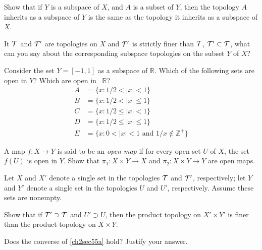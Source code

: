 \begin{exercise}
\item
  Show that if \(Y\) is a subspace of \(X\), and \(A\) is a subset of \(Y\),
  then the topology \(A\) inherits as a subspace of \(Y\) is the same as the
  topology it inherits as a subspace of \(X\).
\item
  It \(\mathcal{T}\) and \(\mathcal{T}'\) are topologies on \(X\) and \(\mathcal{T}'\) is strictly
  finer than \(\mathcal{T}\), \(\mathcal{T}'\subset\mathcal{T}\), what can you say about the
  corresponding subspace topologies on the subset \(Y\) of \(X\)?\
\item
  Consider the set \(Y = [-1,1]\) as a subspace of \(\mathbb{R}\).
  Which of the following sets are open in \(Y\)? Which are open in \
  \(\mathbb{R}\)?
  \begin{align*}
    A & = \{x\colon 1/2 < \lvert x\rvert < 1\}\\
    B & = \{x\colon 1/2 < \lvert x\rvert\leq 1\}\\
    C & = \{x\colon 1/2\leq \lvert x\rvert < 1\}\\
    D & = \{x\colon 1/2\leq \lvert x\rvert\leq 1\}\\
    E & = \{x\colon 0 < \lvert x\rvert < 1\text{ and } 1/x\not\in\mathbb{Z}^+\}
  \end{align*}
\item
  A map \(f\colon X\to Y\) is said to be an \textit{open map} if for every open
  set \(U\) of \(X\), the set \(f(U)\) is open in \(Y\).
  Show that \(\pi_1\colon X\times Y\to X\) and \(\pi_2\colon X\times Y\to Y\)
  are open maps.
\item
  Let \(X\) and \(X'\) denote a single set in the topologies \(\mathcal{T}\) and
  \(\mathcal{T}'\), respectively; let \(Y\) and \(Y'\) denote a single set in the
  topologies \(U\) and \(U'\), respectively.
  Assume these sets are nonempty.
  \begin{exercise}[label = (\alph*), ref = \arabic{exercisei} (\alph*)]
  \item
    \label{ch2sec55a}
    Show that if \(\mathcal{T}'\supset\mathcal{T}\) and \(U'\supset U\), then the product
    topology on \(X'\times Y'\) is finer than the product topology on
    \(X\times Y\).
  \item
    Does the converse of \cref{ch2sec55a} hold?
    Justify your answer.
  \end{exercise}
\end{exercise}

